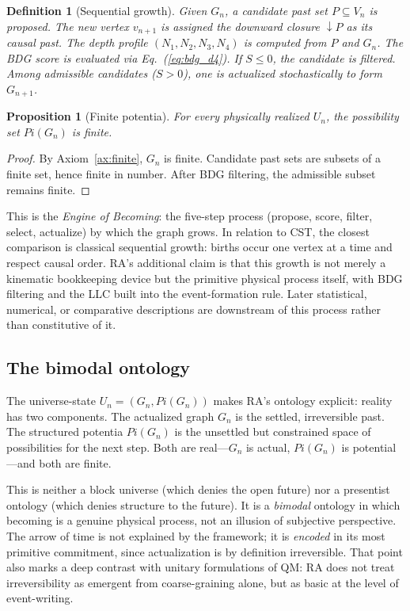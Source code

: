 \documentclass[11pt]{article}
\def\Pi{Pi}%
\newtheorem{definition}{Definition}
\newtheorem{proposition}{Proposition}
\newcommand{\Pot}{\Pi}
\begin{document}
\begin{definition}[Sequential growth]
Given $G_n$, a candidate past set $P\subseteq V_n$ is proposed. The new vertex $v_{n+1}$ is assigned the downward closure $\downarrow\!P$ as its causal past. The depth profile $(N_1,N_2,N_3,N_4)$ is computed from $P$ and $G_n$. The BDG score is evaluated via Eq.~(\ref{eq:bdg_d4}). If $S\le 0$, the candidate is filtered. Among admissible candidates ($S>0$), one is actualized stochastically to form $G_{n+1}$.
\end{definition}

\begin{proposition}[Finite potentia]
For every physically realized $U_n$, the possibility set $\Pot(G_n)$ is finite.
\end{proposition}
\begin{proof}
By Axiom~\ref{ax:finite}, $G_n$ is finite. Candidate past sets are subsets of a finite set, hence finite in number. After BDG filtering, the admissible subset remains finite.
\end{proof}

This is the \emph{Engine of Becoming}: the five-step process (propose, score, filter, select, actualize) by which the graph grows. In relation to CST, the closest comparison is classical sequential growth: births occur one vertex at a time and respect causal order. RA's additional claim is that this growth is not merely a kinematic bookkeeping device but the primitive physical process itself, with BDG filtering and the LLC built into the event-formation rule. Later statistical, numerical, or comparative descriptions are downstream of this process rather than constitutive of it.

\subsection{The bimodal ontology}

The universe-state $U_n=(G_n,\Pot(G_n))$ makes RA's ontology explicit: reality has two components. The actualized graph $G_n$ is the settled, irreversible past. The structured potentia $\Pot(G_n)$ is the unsettled but constrained space of possibilities for the next step. Both are real---$G_n$ is actual, $\Pot(G_n)$ is potential---and both are finite.

This is neither a block universe (which denies the open future) nor a presentist ontology (which denies structure to the future). It is a \emph{bimodal} ontology in which becoming is a genuine physical process, not an illusion of subjective perspective. The arrow of time is not explained by the framework; it is \emph{encoded} in its most primitive commitment, since actualization is by definition irreversible. That point also marks a deep contrast with unitary formulations of QM: RA does not treat irreversibility as emergent from coarse-graining alone, but as basic at the level of event-writing.
\end{document}
